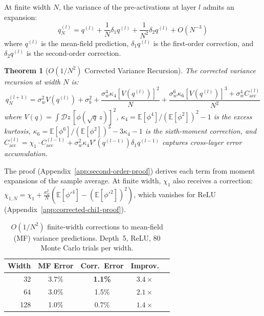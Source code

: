 \documentclass[10pt]{article}
\newcommand{\EE}{\mathbb{E}}
\newtheorem{theorem}{Theorem}
\begin{document}
At finite width $N$, the variance of the pre-activations at layer $l$ admits an expansion:
\begin{equation}
    q_N^{(l)} = q^{(l)} + \frac{1}{N} \delta_1 q^{(l)} + \frac{1}{N^2} \delta_2 q^{(l)} + O(N^{-3})
    \label{eq:finite-width-expansion}
\end{equation}
where $q^{(l)}$ is the mean-field prediction, $\delta_1 q^{(l)}$ is the first-order correction, and $\delta_2 q^{(l)}$ is the second-order correction.

\begin{theorem}[$O(1/N^2)$ Corrected Variance Recursion]
\label{thm:second-order-correction}
The corrected variance recursion at width $N$ is:
\begin{equation}
    q^{(l+1)}_N = \sigma_w^2 V(q^{(l)}) + \sigma_b^2 + \frac{\sigma_w^4 \kappa_4 [V(q^{(l)})]^2}{N} + \frac{\sigma_w^6 \kappa_6 [V(q^{(l)})]^3 + \sigma_w^4 C_{\mathrm{acc}}^{(l)}}{N^2}
    \label{eq:second-order-correction}
\end{equation}
where $V(q) = \int \mathcal{D}z\, [\phi(\sqrt{q}\, z)]^2$, $\kappa_4 = \EE[\phi^4]/(\EE[\phi^2])^2 - 1$ is the excess kurtosis, $\kappa_6 = \EE[\phi^6]/(\EE[\phi^2])^3 - 3\kappa_4 - 1$ is the sixth-moment correction, and $C_{\mathrm{acc}}^{(l)} = \chi_1 \cdot C_{\mathrm{acc}}^{(l-1)} + \sigma_w^2 \kappa_4 V'(q^{(l-1)}) \delta_1 q^{(l-1)}$ captures cross-layer error accumulation.
\end{theorem}

The proof (Appendix~\ref{app:second-order-proof}) derives each term from moment expansions of the sample average.
At finite width, $\chi_1$ also receives a correction: $\chi_{1,N} = \chi_1 + \frac{\sigma_w^2}{N}(\EE[\phi'^4] - (\EE[\phi'^2])^2)$, which vanishes for ReLU (Appendix~\ref{app:corrected-chi1-proof}).

\begin{table}[t]
\centering
\caption{$O(1/N^2)$ finite-width corrections to mean-field (MF) variance predictions. Depth~5, ReLU, 80 Monte Carlo trials per width.}
\label{tab:finite-width}
\small
\begin{tabular}{@{}rcccc@{}}
\toprule
\textbf{Width} & \textbf{MF Error} & \textbf{Corr.\ Error} & \textbf{Improv.} \\
\midrule
32   & 3.7\% & \textbf{1.1\%}  & $3.4\times$ \\
64   & 3.0\%  & 1.5\%  & $2.1\times$ \\
128  & 1.0\%  & 0.7\%  & $1.4\times$ \\
\bottomrule
\end{tabular}
\end{table}
\end{document}
